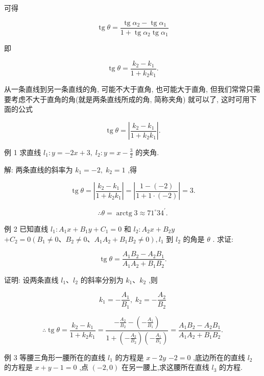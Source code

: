 \documentclass[lang=cn,newtx,10.5pt,scheme=chinese]{elegantbook}
\begin{document}
可得

\[
  \operatorname{tg}\theta = \frac{\operatorname{tg}{\alpha }_{2} - \operatorname{tg}{\alpha }_{1}}{1 + \operatorname{tg}{\alpha }_{2}\operatorname{tg}{\alpha }_{1}}
\]

即

\[
  \operatorname{tg}\theta = \frac{{k}_{2} - {k}_{1}}{1 + {k}_{2}{k}_{1}}.
\]
\begin{corollary}
从一条直线到另一条直线的角, 可能不大于直角, 也可能大于直角, 但我们常常只需要考虑不大于直角的角(就是两条直线所成的角, 简称夹角) 就可以了, 这时可用下面的公式

\[
  \operatorname{tg}\theta = \left| \frac{{k}_{2} - {k}_{1}}{1 + {k}_{2}{k}_{1}}\right| .
\]
\end{corollary}
例 1 求直线 \({l}_{1} : y = - {2x} + 3,\;{l}_{2} : y = x - \frac{3}{2}\) 的夹角.

解: 两条直线的斜率为 \({k}_{1} = - 2,\;{k}_{2} = 1\) ,得

\[
  \operatorname{tg}\theta = \left| \frac{{k}_{2} - {k}_{1}}{1 + {k}_{2}{k}_{1}}\right| = \left| \frac{1 - \left( {-2}\right) }{1 + 1 \cdot \left( {-2}\right) }\right| = 3.
\]

\[
  \therefore \theta = \operatorname{arctg}3 \approx {71}^{ \circ }{34}^{\prime }\text{.}
\]

例 2 已知直线 \({l}_{1} : {A}_{1}x + {B}_{1}y + {C}_{1} = 0\) 和 \({l}_{2} : {A}_{2}x + {B}_{2}y\) \(+ {C}_{2} = 0\left( {{B}_{1} \neq 0\text{、}{B}_{2} \neq 0\text{、}{A}_{1}{A}_{2} + {B}_{1}{B}_{2} \neq 0}\right) ,{l}_{1}\) 到 \({l}_{2}\) 的角是 \(\theta\) . 求证:

\[
  \operatorname{tg}\theta = \frac{{A}_{1}{B}_{2} - {A}_{2}{B}_{1}}{{A}_{1}{A}_{2} + {B}_{1}{B}_{2}}.
\]

证明: 设两条直线 \({l}_{1}\text{、}{l}_{2}\) 的斜率分别为 \({k}_{1}\text{、}{k}_{2}\) ,则

\[
    {k}_{1} = - \frac{{A}_{1}}{{B}_{1}},\;{k}_{2} = - \frac{{A}_{2}}{{B}_{2}}
\]

\[
  \therefore \operatorname{tg}\theta = \frac{{k}_{2} - {k}_{1}}{1 + {k}_{2}{k}_{1}} = \frac{-\frac{{A}_{2}}{{B}_{2}} - \left( {-\frac{{A}_{1}}{{B}_{1}}}\right) }{1 + \left( {-\frac{{A}_{2}}{{B}_{2}}}\right) \left( {-\frac{{A}_{1}}{{B}_{1}}}\right) } = \frac{{A}_{1}{B}_{2} - {A}_{2}{B}_{1}}{{A}_{1}{A}_{2} + {B}_{1}{B}_{2}}\text{.}
\]

例 3 等腰三角形一腰所在的直线 \({l}_{1}\) 的方程是 \(x - {2y}\) \(- 2 = 0\) ,底边所在的直线 \({l}_{2}\) 的方程是 \(x + y - 1 = 0\) ,点 \(\left( {-2,0}\right)\) 在另一腰上,求这腰所在直线 \({l}_{3}\) 的方程.
\end{document}
